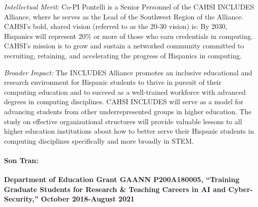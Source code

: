 \noindent \textit{Intellectual Merit:}
Co-PI Pontelli is a Senior Personnel of the CAHSI INCLUDES Alliance, where he serves as the Lead of the Southwest Region of the Alliance. CAHSI’s bold, shared vision (referred to as the 20-30 vision) is:  By 2030, Hispanics will represent 20\% or more of those who earn credentials in computing. 
CAHSI’s mission is to grow and sustain a networked community committed to recruiting, retaining, and accelerating the progress of Hispanics in computing.


\noindent \textit{Broader Impact:}
The INCLUDES Alliance promotes an inclusive educational and research environment for Hispanic students to thrive in pursuit of their computing education and to succeed as a well-trained workforce with advanced degrees in computing disciplines. 
CAHSI INCLUDES will serve as a model for advancing students from other underrepresented groups in higher education. The study on effective organizational structures will provide valuable lessons to all higher education institutions about how to better serve their Hispanic students in computing disciplines specifically and more broadly in STEM. 
\medskip


\paragraph{Son Tran:}
\textbf{Department of Education Grant GAANN P200A180005, ``Training Graduate Students for Research \& Teaching Careers in AI and Cyber-Security,'' October 2018-August 2021}


